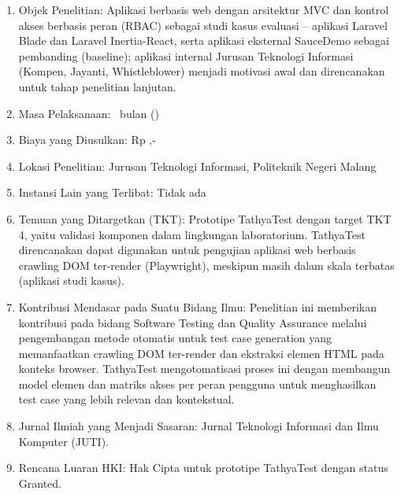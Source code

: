 \begin{enumerate}[itemsep=0.2cm]
\item Objek Penelitian: Aplikasi berbasis web dengan arsitektur MVC dan kontrol akses berbasis peran (RBAC) sebagai studi kasus evaluasi -- aplikasi Laravel Blade dan Laravel Inertia-React, serta aplikasi eksternal SauceDemo sebagai pembanding (baseline); aplikasi internal Jurusan Teknologi Informasi (Kompen, Jayanti, Whistleblower) menjadi motivasi awal dan direncanakan untuk tahap penelitian lanjutan.

\item Masa Pelaksanaan: \lamaPenelitian\ bulan (\bulanTahun)

\item Biaya yang Diusulkan: Rp \biayaDiusulkan,-

\item Lokasi Penelitian: Jurusan Teknologi Informasi, Politeknik Negeri Malang

\item Instansi Lain yang Terlibat: Tidak ada

\item Temuan yang Ditargetkan (TKT): Prototipe TathyaTest dengan target TKT 4, yaitu validasi komponen dalam lingkungan laboratorium. TathyaTest direncanakan dapat digunakan untuk pengujian aplikasi web berbasis crawling DOM ter-render (Playwright), meskipun masih dalam skala terbatas (aplikasi studi kasus).

\item Kontribusi Mendasar pada Suatu Bidang Ilmu: Penelitian ini memberikan kontribusi pada bidang Software Testing dan Quality Assurance melalui pengembangan metode otomatis untuk test case generation yang memanfaatkan crawling DOM ter-render dan ekstraksi elemen HTML pada konteks browser. TathyaTest mengotomatisasi proses ini dengan membangun model elemen dan matriks akses per peran pengguna untuk menghasilkan test case yang lebih relevan dan kontekstual.

\item Jurnal Ilmiah yang Menjadi Sasaran: Jurnal Teknologi Informasi dan Ilmu Komputer (JUTI).

\item Rencana Luaran HKI: Hak Cipta untuk prototipe TathyaTest dengan status Granted.

\end{enumerate}
